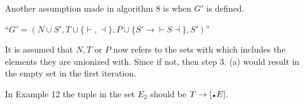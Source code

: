 Another assumption made in algorithm 8 is when $G'$ is defined.
\begin{center}
    ``$G' = (N \cup {S'}, T \cup \{\vdash, \dashv\}, P \cup \{S' \to \vdash S \dashv\}, S')$''
\end{center}
It is assumed that $N, T$ or $P$ now refers to the sets with which includes the elements they are unionized with. Since if not, then step 3. (a) would result in the empty set in the first iteration.

In Example 12 \cite[14]{Vagner2007} the tuple in the set $E_2$ should be $T \to [\bigdot E]$.
